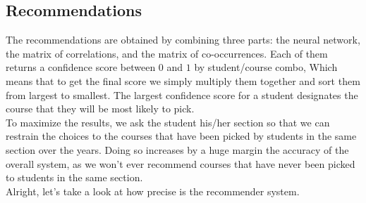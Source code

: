 \documentclass{article}
\begin{document}
    \subsection{Recommendations}
        The recommendations are obtained by combining three parts: the neural network, the matrix of correlations, and the matrix of co-occurrences. Each of them returns a confidence score between $0$ and $1$ by student/course combo, Which means that to get the final score we simply multiply them together and sort them from largest to smallest. The largest confidence score for a student designates the course that they will be most likely to pick.
        \\To maximize the results, we ask the student his/her section so that we can restrain the choices to the courses that have been picked by students in the same section over the years. Doing so increases by a huge margin the accuracy of the overall system, as we won't ever recommend courses that have never been picked to students in the same section.
        \\Alright, let's take a look at how precise is the recommender system.
\end{document}
